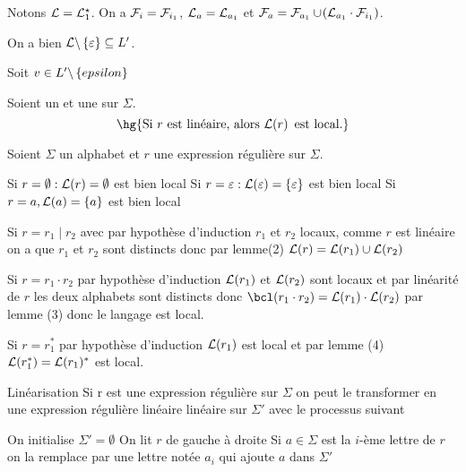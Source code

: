 \documentclass[a4paper,french,bookmarks]{book}
\begin{document}
\begin{nproof}
\begin{psse}
\begin{enumerate}
            \end{enumerate}     
            
            \item Notons $\mathcal{L} = \mathcal{L}_1^\star$. On a $\mathcal{F}_i = \mathcal{F}_{i_1}$, $\mathcal{L}_a = \mathcal{L}_{a_1}$ et $\mathcal{F}_a = \mathcal{F}_{a_1} \cup \!\left(\mathcal{L}_{a_1} \cdot \mathcal{F}_{i_1}\right)$.
                
            On a bien $\mathcal{L} \backslash \left\{\varepsilon\right\} \subseteq L'$.
                
                Soit $v \in L' \backslash \left\{epsilon\right\} $

        \end{psse}
    \end{nproof}
    
    
    \begin{property}{}{}
        Soient \hg{$\Sigma$} un  et  une  sur $\Sigma$.
        \[ \hg{\text{Si} \ r \ \text{est linéaire, alors} \ \bcL\p{r} \ \text{est local.}} \]
    \end{property}
    
    \begin{nproof}
        Soient $\Sigma$ un alphabet et $r$ une expression régulière sur $\Sigma$.
        \begin{enumerate}
            \itt Si \(r = \emptyset : \mathcal{L}(r) = \emptyset\) est bien local
            \itt Si \(r= \varepsilon : \mathcal{L}(\varepsilon) = \left\{\varepsilon\right\}\) est bien local
            \itt Si \(r=a, \mathcal{L}(a) = \left\{a\right\}\) est bien local

            \itt Si \(r = r_1 \mid r_2\) avec par hypothèse d'induction \(r_1\) et \(r_2\) locaux, comme \(r\) est linéaire on a que \(r_1\) et \(r_2\) sont distincts donc par lemme(2) \(\mathcal{L}(r) = \mathcal{L}(r_1)\cup\mathcal{L}(r_2)\)

            \itt Si \(r = r_1 \cdot r_2\) par hypothèse d'induction \(\mathcal{L}(r_1)\) et \(\mathcal{L}(r_2)\) sont locaux et par linéarité de \(r\) les deux alphabets sont distincts donc \(\bcl(r_1\cdot r_2) = \bcL(r_1) \cdot \bcL(r_2)\) par lemme (3) donc le langage est local.

            \itt Si \(r = r_1^*\) par hypothèse d'induction \(\mathcal{L}(r_1)\) est local et par lemme (4) \(\mathcal{L}(r_1^*) = \mathcal{L}(r_1)^*\) est local.
        \end{enumerate}
    \end{nproof}
    
    \begin{definition}{Linéarisation}
        Si r est une expression régulière sur $\Sigma$ on peut le transformer en une 
        expression régulière linéaire linéaire sur $\Sigma'$ avec le processus suivant
        \begin{enumerate}
            \itast On initialise \(\Sigma' = \emptyset\)
            \itast On lit \(r\) de gauche à droite 
            \itast Si \(a\in\Sigma\) est la \(i\)-ème lettre de \(r\) on la remplace par une lettre notée \(a_i\) qui ajoute \(a\) dans \(\Sigma'\)
        \end{enumerate}
    \end{definition}
    
\end{document}
